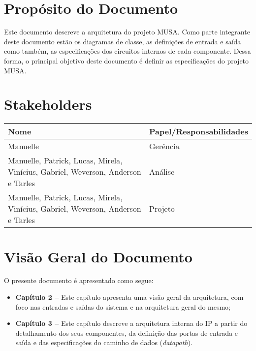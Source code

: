   \section{Propósito do Documento}
  Este documento descreve a arquitetura do projeto MUSA. Como parte integrante deste documento estão os diagramas de classe, as definições de entrada e saída como também, as especificações dos circuitos internos de cada componente. Dessa forma, o principal objetivo deste documento é definir as especificações do projeto MUSA.

  \section{Stakeholders}
    \FloatBarrier
    \begin{table}[H] 
      \begin{center}
        \begin{tabular}[pos]{|m{6cm} | m{8cm}|} 
          \hline 
          \cellcolor[gray]{0.9}\textbf{Nome} & \cellcolor[gray]{0.9}\textbf{Papel/Responsabilidades} \\  
           \hline Manuelle 	& Gerência \\
           \hline Manuelle, Patrick, Lucas, Mirela, Vinícius, Gabriel, Weverson, Anderson e Tarles 	& Análise \\
           \hline Manuelle, Patrick, Lucas, Mirela, Vinícius, Gabriel, Weverson, Anderson e Tarles 	& Projeto \\ \hline
        \end{tabular}
      \end{center}
    \end{table} 

\section{Visão Geral do Documento}

O presente documento é apresentado como segue:

  \begin{itemize}
   \item \textbf{Capítulo 2 --} Este capítulo apresenta uma visão geral da arquitetura, com foco nas entradas e saídas do sistema e na arquitetura geral do mesmo;
   \item \textbf{Capítulo 3 --} Este capítulo descreve a arquitetura interna do IP a partir do detalhamento dos seus componentes, da definição das portas de entrada e saída e das especificações do caminho de dados (\textit{datapath}).
  \end{itemize}

